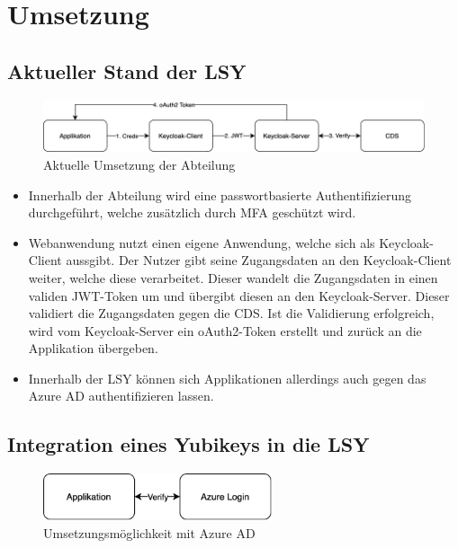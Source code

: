 \chapter{Umsetzung}

\section{Aktueller Stand der LSY}
\begin{figure}[h]
	\centering 
	\includegraphics[width=1\textwidth]{img/abbildungen/Unknown.png}
	\captionsetup{format=hang}
	\caption{Aktuelle Umsetzung der Abteilung}
\end{figure}

\begin{itemize}
    \item Innerhalb der Abteilung wird eine passwortbasierte Authentifizierung durchgeführt, welche zusätzlich durch \ac{MFA} geschützt wird.
    \item Webanwendung nutzt einen eigene Anwendung, welche sich als Keycloak-Client aussgibt. Der Nutzer gibt seine Zugangsdaten an den Keycloak-Client weiter, welche diese verarbeitet. Dieser wandelt die Zugangsdaten in einen validen JWT-Token um und übergibt diesen an den Keycloak-Server. Dieser validiert die Zugangsdaten gegen die \ac{CDS}. Ist die Validierung erfolgreich, wird vom Keycloak-Server ein oAuth2-Token erstellt und zurück an die Applikation übergeben.
    \item Innerhalb der \ac{LSY} können sich Applikationen allerdings auch gegen das Azure \ac{AD} authentifizieren lassen. 
\end{itemize}

\section{Integration eines Yubikeys in die LSY}

\begin{figure}[h]
	\centering 
	\includegraphics[width=0.6\textwidth]{img/abbildungen/azure_umsetzung.png}
	\captionsetup{format=hang}
	\caption{Umsetzungsmöglichkeit mit Azure \ac{AD}}
\end{figure}

